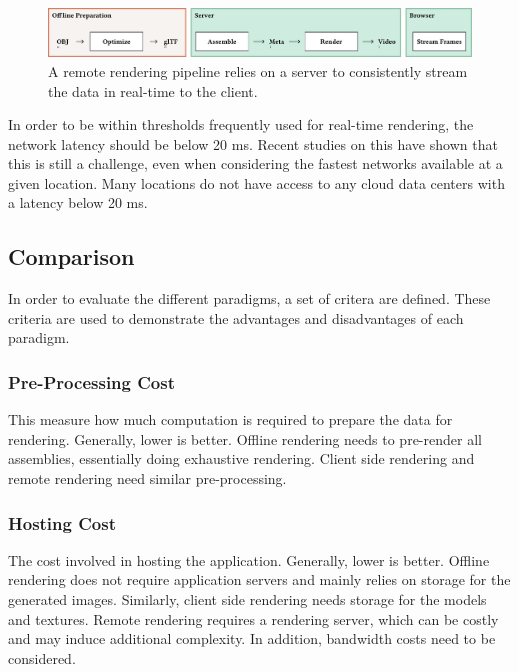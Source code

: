 \begin{figure}[H]
  \includegraphics[width=\columnwidth]{resources/cad-pipeline-remote.png}
  \caption{A remote rendering pipeline relies on a server to consistently stream the data in real-time to the client.}
  \label{fig:cad-remote}
\end{figure}

In order to be within thresholds frequently used for real-time rendering, the network latency should be below 20 ms. Recent studies on this have shown that this is still a challenge, even when considering the fastest networks available at a given location. Many locations do not have access to any cloud data centers with a latency below 20 ms. \cite{cloudLatency}

\subsection*{Comparison}

In order to evaluate the different paradigms, a set of critera are defined. These criteria are used to demonstrate the advantages and disadvantages of each paradigm.

\subsubsection{Pre-Processing Cost}

This measure how much computation is required to prepare the data for rendering. Generally, lower is better. Offline rendering needs to pre-render all assemblies, essentially doing exhaustive rendering. Client side rendering and remote rendering need similar pre-processing.

\subsubsection{Hosting Cost}

The cost involved in hosting the application. Generally, lower is better. Offline rendering does not require application servers and mainly relies on storage for the generated images. Similarly, client side rendering needs storage for the models and textures. Remote rendering requires a rendering server, which can be costly and may induce additional complexity. In addition, bandwidth costs need to be considered.

